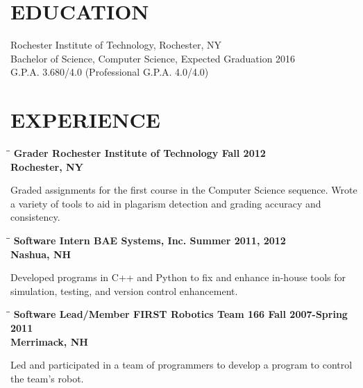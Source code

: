 \documentclass{res}
\begin{document}
\begin{resume}

\section{EDUCATION}
    Rochester Institute of Technology, Rochester, NY  \\
    Bachelor of Science, Computer Science, Expected Graduation 2016   \\
    G.P.A. 3.680/4.0 (Professional G.P.A. 4.0/4.0)


\section{EXPERIENCE}
   \vspace{-0.1in}

   \begin{tabbing}
   \hspace{2.3in}\= \hspace{2.4in}\= \kill %
    \bf Grader
    \>Rochester Institute of Technology
    \>Fall 2012
    \\\>Rochester, NY
   \end{tabbing}\vspace{-15pt}      %
    Graded assignments for the first course in the Computer Science sequence.
    Wrote a variety of tools to aid in plagarism detection and grading accuracy and consistency.

   \begin{tabbing}
   \hspace{2.3in}\= \hspace{2.4in}\= \kill %
    \bf Software Intern
    \>BAE Systems, Inc.
    \>Summer 2011, 2012
    \\\>Nashua, NH
   \end{tabbing}\vspace{-15pt}      %
    Developed programs in C++ and Python to fix and enhance in-house tools
    for simulation, testing, and version control enhancement.

   \begin{tabbing}
   \hspace{2.3in}\= \hspace{2.4in}\= \kill %
   \bf Software Lead/Member
    \>FIRST Robotics Team 166
    \>Fall 2007-Spring 2011
    \\\>Merrimack, NH
   \end{tabbing}\vspace{-15pt}      %
    Led and participated in a team of programmers to develop a program to control
    the team's robot.


\end{resume}
\end{document}
